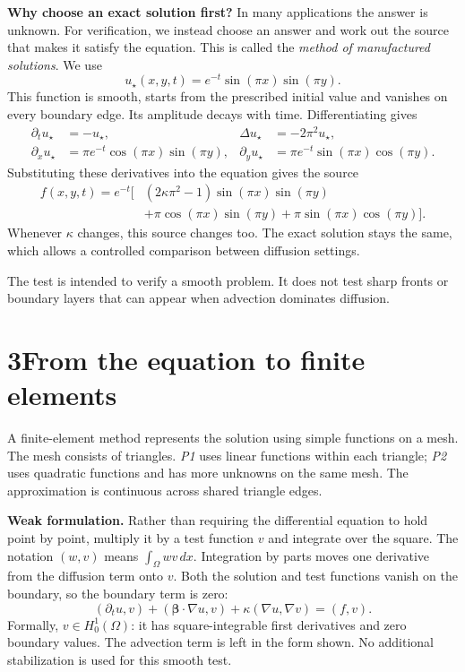 \documentclass[11pt,a4paper]{article}
\begin{document}
\textbf{Why choose an exact solution first?} In many applications the answer is unknown. For verification, we instead choose an answer and work out the source that makes it satisfy the equation. This is called the \emph{method of manufactured solutions}. We use
\begin{equation}
u_\star(x,y,t)=e^{-t}\sin(\pi x)\sin(\pi y).
\end{equation}
This function is smooth, starts from the prescribed initial value and vanishes on every boundary edge. Its amplitude decays with time. Differentiating gives
\begin{align}
\partial_tu_\star&=-u_\star,& \Delta u_\star&=-2\pi^2u_\star,\\
\partial_xu_\star&=\pi e^{-t}\cos(\pi x)\sin(\pi y),&
\partial_yu_\star&=\pi e^{-t}\sin(\pi x)\cos(\pi y).
\end{align}
Substituting these derivatives into the equation gives the source
\begin{align}
f(x,y,t)=e^{-t}\big[&(2\kappa\pi^2-1)\sin(\pi x)\sin(\pi y)\nonumber\\
&+\pi\cos(\pi x)\sin(\pi y)+\pi\sin(\pi x)\cos(\pi y)\big].
\end{align}
Whenever $\kappa$ changes, this source changes too. The exact solution stays the same, which allows a controlled comparison between diffusion settings.

The test is intended to verify a smooth problem. It does not test sharp fronts or boundary layers that can appear when advection dominates diffusion.

\newpage
\section*{3\quad From the equation to finite elements}
A finite-element method represents the solution using simple functions on a mesh. The mesh consists of triangles. \emph{P1} uses linear functions within each triangle; \emph{P2} uses quadratic functions and has more unknowns on the same mesh. The approximation is continuous across shared triangle edges.

\textbf{Weak formulation.} Rather than requiring the differential equation to hold point by point, multiply it by a test function $v$ and integrate over the square. The notation $(w,v)$ means $\int_\Omega wv\,dx$. Integration by parts moves one derivative from the diffusion term onto $v$. Both the solution and test functions vanish on the boundary, so the boundary term is zero:
\begin{equation}
(\partial_tu,v)+(\boldsymbol\beta\cdot\nabla u,v)
       +\kappa(\nabla u,\nabla v)=(f,v).
\end{equation}
Formally, $v\in H_0^1(\Omega)$: it has square-integrable first derivatives and zero boundary values. The advection term is left in the form shown. No additional stabilization is used for this smooth test.
\end{document}
